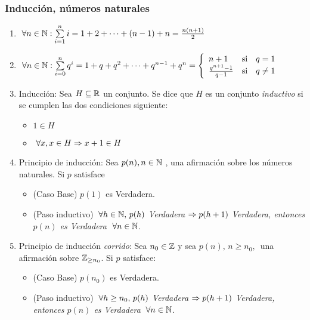 \subsubsection*{Inducción, números naturales}

\begin{enumerate}
	\item $\paratodo n \en \naturales: \sumatoria{i = 1}{n} i =  1 + 2 + \cdots + (n-1) + n = \frac{n(n+1)}{2}$

	\item $\paratodo n \en \naturales: \sumatoria{i = 0}{n} q^i =
		      1 + q + q^2 + \cdots  + q^{n-1} + q^n =
		      \llave{lll}{
			      n+1 & \text{si} & q = 1\\
			      \frac{q^{n+1}-1}{q-1} & \text{si} & q \distinto 1\\
		      }$

	\item Inducción: Sea $H \subseteq \reales$ un conjunto. Se dice que $H$ es un conjunto \textit{inductivo} si se cumplen las dos condiciones siguiente:
	      \begin{itemize}
		      \item $1 \in H$
		      \item $\paratodo x , x \in H \entonces x+1 \en H$
	      \end{itemize}

	\item Principio de inducción: Sea $p(n), n \in \naturales$ , una afirmación sobre los números naturales.
	      Si $p$ satisface
	      \begin{itemize}
		      \item (Caso Base) $p(1)$ es Verdadera.
		      \item (Paso inductivo) $\paratodo h \en \naturales,\, p(h)$ \textit{Verdadera}
		            $\entonces p(h+1)$ \textit{Verdadera, entonces $p(n)$ es Verdadera} $\paratodo n \en \naturales$.
	      \end{itemize}

	\item Principio de inducción \textit{corrido}: Sea $n_0 \en \enteros$ y sea $p(n),\, n\geq n_0,\,$ una afirmación sobre $\enteros_{\geq n_0}$. Si $p$
	      satisface:
	      \begin{itemize}
		      \item (Caso Base) $p(n_0)$ es Verdadera.
		      \item (Paso inductivo) $\paratodo h \geq n_0,\, p(h)$ \textit{Verdadera}
		            $\entonces p(h+1)$ \textit{Verdadera, entonces $p(n)$ es Verdadera} $\paratodo n \en \naturales$.
	      \end{itemize}
\end{enumerate}

